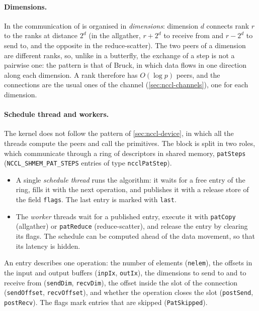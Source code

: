 \paragraph{Dimensions.}
In \nccl{} the communication of \pat{} is organised in \emph{dimensions}: dimension $d$ connects rank $r$ to the ranks at distance $2^d$ (in the allgather, $r+2^d$ to receive from and $r-2^d$ to send to, and the opposite in the reduce-scatter).
The two peers of a dimension are different ranks, so, unlike in a butterfly, the exchange of a step is not a pairwise one: the pattern is that of Bruck, in which data flows in one direction along each dimension.
A rank therefore has $O(\log p)$ peers, and the connections are the usual ones of the channel (\cref{sec:nccl-channels}), one for each dimension.

\paragraph{Schedule thread and workers.}
The kernel does not follow the pattern of \cref{sec:nccl-device}, in which all the threads compute the peers and call the primitives.
The block is split in two roles, which communicate through a ring of descriptors in shared memory, \texttt{patSteps} (\texttt{NCCL\_SHMEM\_PAT\_STEPS} entries of type \texttt{ncclPatStep}).
\begin{itemize}
  \item A single \emph{schedule thread} runs the algorithm: it waits for a free entry of the ring, fills it with the next operation, and publishes it with a release store of the field \texttt{flags}.
  The last entry is marked with \texttt{last}.
  \item The \emph{worker} threads wait for a published entry, execute it with \texttt{patCopy} (allgather) or \texttt{patReduce} (reduce-scatter), and release the entry by clearing its flags.
  The schedule can be computed ahead of the data movement, so that its latency is hidden.
\end{itemize}
An entry describes one operation: the number of elements (\texttt{nelem}), the offsets in the input and output buffers (\texttt{inpIx}, \texttt{outIx}), the dimensions to send to and to receive from (\texttt{sendDim}, \texttt{recvDim}), the offset inside the slot of the connection (\texttt{sendOffset}, \texttt{recvOffset}), and whether the operation closes the slot (\texttt{postSend}, \texttt{postRecv}).
The flags mark entries that are skipped (\texttt{PatSkipped}).

